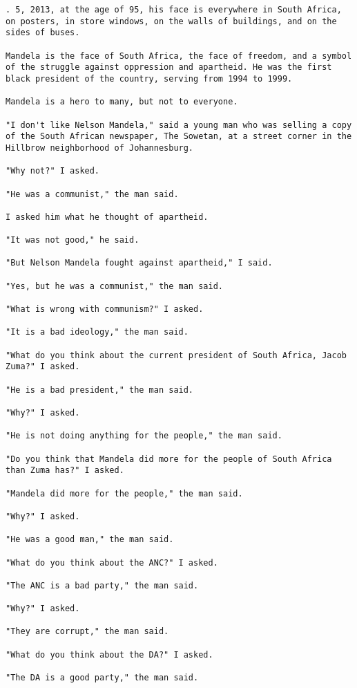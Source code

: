 \begin{lstlisting}
. 5, 2013, at the age of 95, his face is everywhere in South Africa, on posters, in store windows, on the walls of buildings, and on the sides of buses.

Mandela is the face of South Africa, the face of freedom, and a symbol of the struggle against oppression and apartheid. He was the first black president of the country, serving from 1994 to 1999.

Mandela is a hero to many, but not to everyone.

"I don't like Nelson Mandela," said a young man who was selling a copy of the South African newspaper, The Sowetan, at a street corner in the Hillbrow neighborhood of Johannesburg.

"Why not?" I asked.

"He was a communist," the man said.

I asked him what he thought of apartheid.

"It was not good," he said.

"But Nelson Mandela fought against apartheid," I said.

"Yes, but he was a communist," the man said.

"What is wrong with communism?" I asked.

"It is a bad ideology," the man said.

"What do you think about the current president of South Africa, Jacob Zuma?" I asked.

"He is a bad president," the man said.

"Why?" I asked.

"He is not doing anything for the people," the man said.

"Do you think that Mandela did more for the people of South Africa than Zuma has?" I asked.

"Mandela did more for the people," the man said.

"Why?" I asked.

"He was a good man," the man said.

"What do you think about the ANC?" I asked.

"The ANC is a bad party," the man said.

"Why?" I asked.

"They are corrupt," the man said.

"What do you think about the DA?" I asked.

"The DA is a good party," the man said.


\end{lstlisting}
